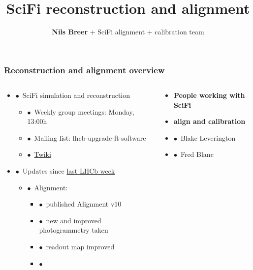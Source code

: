 \documentclass[aspectratio=1610, 12pt, xcolor=dvipsnames]{beamer}
\title{SciFi reconstruction and alignment}
\author[N.Breer]{\textbf{Nils Breer} + SciFi alignment + calibration team}
\institute{SciFi general at 108th LHCb week - 5th june 2023}
\begin{document}
\maketitle

\begin{frame}\frametitle{Reconstruction and alignment overview}
  \begin{columns}
    \begin{column}[c]{0.66\textwidth}
      \begin{itemize}
        \item $\bullet$\, SciFi simulation and reconstruction
        \begin{itemize}
          \item $\bullet$\, Weekly group meetings: Monday, 13:00h
          \item $\bullet$\, Mailing list: lhcb-upgrade-ft-software
          \item $\bullet$\, \href{https://twiki.cern.ch/twiki/bin/view/LHCb/SciFiSimulation}{Twiki}
        \end{itemize}
        \item $\bullet$\, Updates since \href{https://indico.cern.ch/event/1253790/}{last LHCb week}
        \begin{itemize}
          \item $\bullet$\, Alignment:
          \begin{itemize}
            \item $\bullet$\, published Alignment v10
            \item $\bullet$\, new and improved photogrammetry taken
            \item $\bullet$\, readout map improved
            \item $\bullet$\,
          \end{itemize}
        \end{itemize}
      \end{itemize}
    \end{column}
    \begin{column}[c]{0.33\textwidth}
      \begin{itemize}
        \item \scriptsize \textbf{People working with SciFi}
        \item \textbf{align and calibration}
        \item $\bullet$\, Blake Leverington
        \item $\bullet$\, Fred Blanc

\end{itemize}
\end{column}
\end{columns}
\end{frame}
\end{document}
